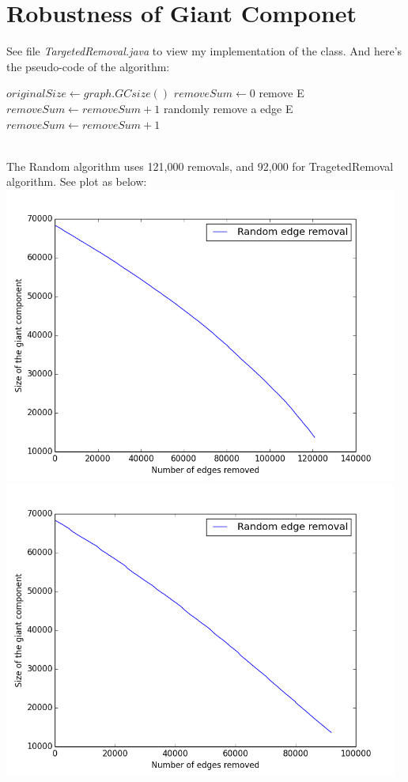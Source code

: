 \documentclass[11pt]{article} %
\begin{document}
\section{Robustness of Giant Componet}
See file \emph{TargetedRemoval.java} to view my implementation of the class. And here's the pseudo-code of the algorithm:
\\
\begin{algorithm}
	\begin{algorithmic}[1]
			\State $originalSize \gets graph.GCsize()$
				\State $removeSum \gets 0$
					\State remove E
					\State $removeSum \gets removeSum + 1$
				\EndWhile
					\State randomly remove a edge E
					\State $removeSum \gets removeSum + 1$
				\EndWhile
			\EndWhile
		\EndFunction
	\end{algorithmic}
\end{algorithm}
\\
The Random algorithm uses 121,000 removals, and 92,000 for TragetedRemoval algorithm. See plot as below:
\\
\includegraphics[width=13cm]{pics/giant-component-1}
\\
\includegraphics[width=13cm]{pics/giant-component}
\end{document}

